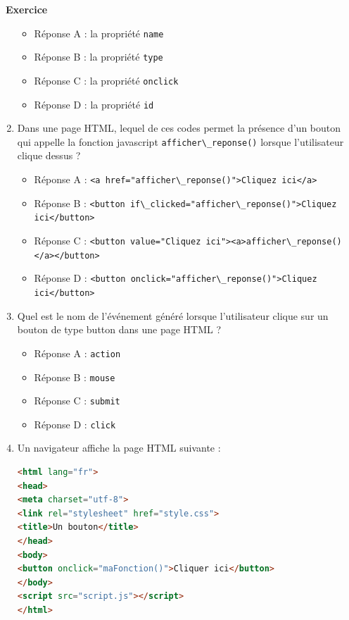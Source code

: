 \documentclass[
  11pt,
]{article}
\newcommand{\passthrough}[1]{#1}
\providecommand{\tightlist}{%
  \setlength{\itemsep}{0pt}\setlength{\parskip}{0pt}}
\newcounter{exo}
\newenvironment{exercice}[1]
{\par \medskip   \addtocounter{exo}{1} \noindent  
\begin{bclogo}[arrondi =0.1,   noborder = true, logo=\bccrayon, marge=4]{~\textbf{Exercice} \textbf{\theexo} {\itshape #1} }  \par}
{
\end{bclogo}
 \par \bigskip }
\newcounter{prop}
\begin{document}
\begin{exercice}{}
\begin{enumerate}
  \begin{itemize}
  \tightlist
  \item
    Réponse A : la propriété \passthrough{\lstinline!name!}
  \item
    Réponse B : la propriété \passthrough{\lstinline!type!}
  \item
    Réponse C : la propriété \passthrough{\lstinline!onclick!}
  \item
    Réponse D : la propriété \passthrough{\lstinline!id!}
  \end{itemize}
\item
  Dans une page HTML, lequel de ces codes permet la présence d'un bouton
  qui appelle la fonction javascript
  \passthrough{\lstinline!afficher\_reponse()!} lorsque l'utilisateur
  clique dessus ?

  \begin{itemize}
  \tightlist
  \item
    Réponse A :
    \passthrough{\lstinline!<a href="afficher\_reponse()">Cliquez ici</a>!}
  \item
    Réponse B :
    \passthrough{\lstinline!<button if\_clicked="afficher\_reponse()">Cliquez ici</button>!}
  \item
    Réponse C :
    \passthrough{\lstinline!<button value="Cliquez ici"><a>afficher\_reponse()</a></button>!}
  \item
    Réponse D :
    \passthrough{\lstinline!<button onclick="afficher\_reponse()">Cliquez ici</button>!}
  \end{itemize}
\item
  Quel est le nom de l'événement généré lorsque l'utilisateur clique sur
  un bouton de type button dans une page HTML ?

  \begin{itemize}
  \tightlist
  \item
    Réponse A : \passthrough{\lstinline!action!}
  \item
    Réponse B : \passthrough{\lstinline!mouse!}
  \item
    Réponse C : \passthrough{\lstinline!submit!}
  \item
    Réponse D : \passthrough{\lstinline!click!}
  \end{itemize}
\item
  Un navigateur affiche la page HTML suivante :

\begin{lstlisting}[language=HTML]
<html lang="fr">
<head>
<meta charset="utf-8">
<link rel="stylesheet" href="style.css">
<title>Un bouton</title>
</head>
<body>
<button onclick="maFonction()">Cliquer ici</button>
</body>
<script src="script.js"></script>
</html>
\end{lstlisting}


\end{enumerate}
\end{exercice}
\end{document}
